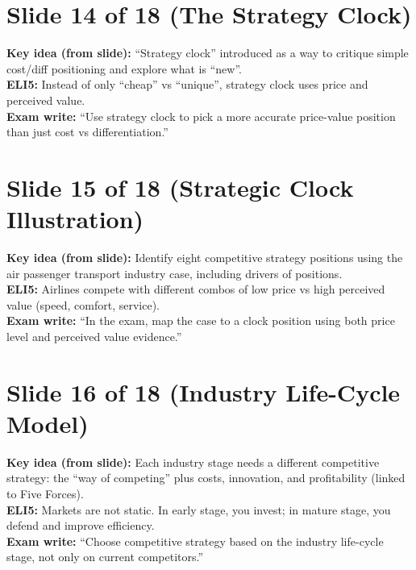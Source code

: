 \documentclass[11pt,a4paper]{article}
\begin{document}
\section*{Slide 14 of 18 (The Strategy Clock)}
\textbf{Key idea (from slide):} ``Strategy clock'' introduced as a way to critique simple cost/diff positioning and explore what is ``new''.\\
\textbf{ELI5:} Instead of only ``cheap'' vs ``unique'', strategy clock uses price and perceived value.\\
\textbf{Exam write:} ``Use strategy clock to pick a more accurate price-value position than just cost vs differentiation.''

\section*{Slide 15 of 18 (Strategic Clock Illustration)}
\textbf{Key idea (from slide):} Identify eight competitive strategy positions using the air passenger transport industry case, including drivers of positions.\\
\textbf{ELI5:} Airlines compete with different combos of low price vs high perceived value (speed, comfort, service).\\
\textbf{Exam write:} ``In the exam, map the case to a clock position using both price level and perceived value evidence.''

\section*{Slide 16 of 18 (Industry Life-Cycle Model)}
\textbf{Key idea (from slide):} Each industry stage needs a different competitive strategy: the ``way of competing'' plus costs, innovation, and profitability (linked to Five Forces).\\
\textbf{ELI5:} Markets are not static. In early stage, you invest; in mature stage, you defend and improve efficiency.\\
\textbf{Exam write:} ``Choose competitive strategy based on the industry life-cycle stage, not only on current competitors.''
\end{document}
